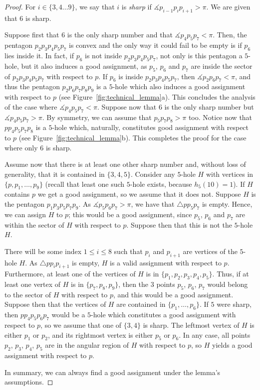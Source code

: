 \documentclass[12pt,reqno, a4paper]{amsart}
\begin{document}
\begin{proof}
    For $i\in \{3, 4 ... 9\}$, we say that $i$ is \textit{sharp} if $\measuredangle p_{i-1}p_i p_{i+1} > \pi$. We are given that $6$ is sharp. 
    
    Suppose first that $6$ is the only sharp number and that $\measuredangle p_4 p_5 p_7 < \pi$. Then, the pentagon $p_2p_3p_4p_5p_7$ is convex and the only way it could fail to be empty is if $p_6$ lies inside it. In fact, if $p_6$ is not inside $p_2p_3p_4p_5p_7$, not only is this pentagon a $5$-hole, but it also induces a good assignment, as $p_5$, $p_6$ and $p_7$ are inside the sector of $p_2p_3p_4p_5p_7$ with respect to $p$. If $p_6$ is inside $p_2p_3p_4p_5p_7$, then $\measuredangle p_2p_6p_7 < \pi$, and thus the pentagon $p_2p_6p_7p_8p_9$ is a $5$-hole which also induces a good assignment with respect to $p$ (see Figure~\ref{fig:technical_lemma}a). This concludes the analysis of the case where $\measuredangle p_4 p_5 p_7 < \pi$. Suppose now that $6$ is the only sharp number but $\measuredangle p_4p_5p_7 > \pi$. By symmetry, we can assume that $p_5p_7p_8 > \pi$ too. Notice now that $pp_4p_5p_7p_8$ is a $5$-hole which, naturally, constitutes good assignment with respect to $p$ (see Figure~\ref{fig:technical_lemma}b). This completes the proof for the case where only $6$ is sharp. 
    
    Assume now that there is at least one other sharp number and, without loss of generality, that it is contained in $\{3, 4, 5\}$. Consider any $5$-hole $H$ with vertices in $\{p,p_1,\dots,p_9\}$ (recall that least one such $5$-hole exists, because $h_5(10)=1$). If $H$ contains $p$ we get a good assignment, so we assume that it does not. Suppose $H$ is the pentagon $p_1p_3p_5p_7p_9$. As $\measuredangle p_5p_6p_7 > \pi$, we have that $\triangle pp_5p_7$ is empty. Hence, we can assign $H$ to $p$; this would be a good assignment, since $p_5$, $p_6$ and $p_7$ are within the sector of $H$ with respect to $p$. Suppose then that this is not the $5$-hole $H$. 
    
    There will be some index $1\leq i\leq 8$ such that $p_i$ and $p_{i+1}$ are vertices of the $5$-hole $H$. As $\triangle pp_ip_{i+1}$ is empty, $H$ is a valid assignment with respect to $p$. Furthermore, at least one of the vertices of $H$ is in $\{p_1, p_2, p_3, p_4, p_5\}$. Thus, if at least one vertex of $H$ is in $\{p_7, p_8, p_9\}$, then the $3$ points $p_5$, $p_6$, $p_7$ would belong to the sector of $H$ with respect to $p$, and this would be a good assignment. Suppose then that the vertices of $H$ are contained in $\{p_1,\dots,p_6\}$. If $5$ were sharp, then $pp_4p_5p_6p_7$ would be a $5$-hole which constitutes a good assignment with respect to $p$, so we assume that one of $\{3,4\}$ is sharp. The leftmost vertex of $H$ is either $p_1$ or $p_2$, and its rightmost vertex is either $p_5$ or $p_6$. In any case, all points $p_2$, $p_3$, $p_4$, $p_5$ are in the angular region of $H$ with respect to $p$, so $H$ yields a good assignment with respect to $p$.
    
    In summary, we can always find a good assignment under the lemma's assumptions.
\end{proof}
\end{document}
